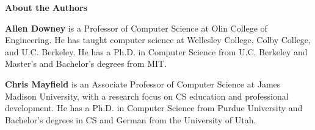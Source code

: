 \documentclass[12pt]{book}
\theoremstyle{exercise}
\begin{document}

\fi



\mainmatter





























\appendix
{}

\renewcommand{\chaptermark}[1]{\markboth{Appendix \thechapter ~~ #1}{}}











\backmatter

\printindex

\newpage
\thispagestyle{empty}

\vspace*{64pt}

{\bf\huge About the Authors}

\vspace*{40pt}

{\bf Allen Downey} is a Professor of Computer Science at Olin College of Engineering.
He has taught computer science at Wellesley College, Colby College, and U.C. Berkeley.
He has a Ph.D. in Computer Science from U.C. Berkeley and Master's and Bachelor's degrees from MIT.

{\bf Chris Mayfield} is an Associate Professor of Computer Science at James Madison University, with a research focus on CS education and professional development.
He has a Ph.D. in Computer Science from Purdue University and Bachelor's degrees in CS and German from the University of Utah.
\end{document}
